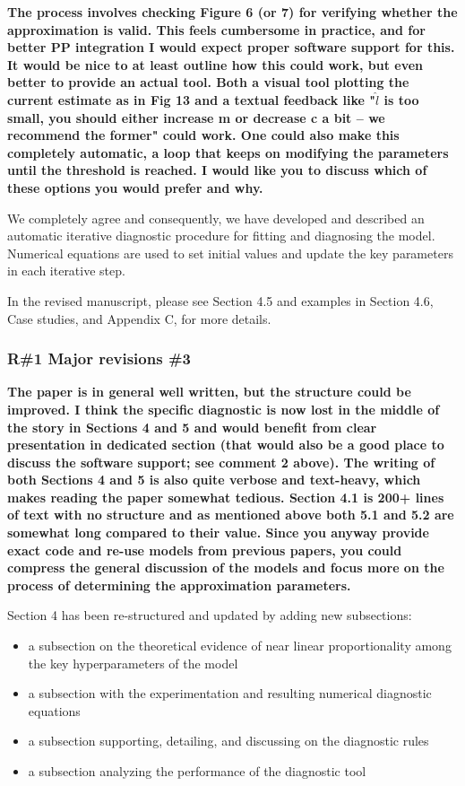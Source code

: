 \documentclass[11pt]{report}
\begin{document}
\textbf{The process involves checking Figure 6 (or 7) for verifying whether the approximation is valid. This feels cumbersome in practice, and for better PP integration I would expect proper software support for this. It would be nice to at least outline how this could work, but even better to provide an actual tool. Both a visual tool plotting the current estimate as in Fig 13 and a textual feedback like "$\hat l$ is too small, you should either increase m or decrease c a bit -- we recommend the former" could work. One could also make this completely automatic, a loop that keeps on modifying the parameters until the threshold is reached. I would like you to discuss which of these options you would prefer and why.}


We completely agree and consequently, we have developed and described an automatic iterative diagnostic procedure for fitting and diagnosing the model. Numerical equations are used to set initial values and update the key parameters in each iterative step.
 
In the revised manuscript, please see Section 4.5 and examples in Section 4.6, Case studies, and Appendix C, for more details.

\subsubsection*{R\#1 Major revisions \#3}

\textbf{The paper is in general well written, but the structure could be improved. I think the specific diagnostic is now lost in the middle of the story in Sections 4 and 5 and would benefit from clear presentation in dedicated section (that would also be a good place to discuss the software support; see comment 2 above). The writing of both Sections 4 and 5 is also quite verbose and text-heavy, which makes reading the paper somewhat tedious. Section 4.1 is 200+ lines of text with no structure and as mentioned above both 5.1 and 5.2 are somewhat long compared to their value. Since you anyway provide exact code and re-use models from previous papers, you could compress the general discussion of the models and focus more on the process of determining the approximation parameters.}

Section 4 has been re-structured and updated by adding new subsections:
\begin{itemize}
	\item a subsection on the theoretical evidence of near linear proportionality among the key hyperparameters of the model
	\item a subsection with the experimentation and resulting numerical diagnostic equations
	\item a subsection supporting, detailing, and discussing on the diagnostic rules
	\item a subsection analyzing the performance of the diagnostic tool
\end{itemize}
\end{document}
